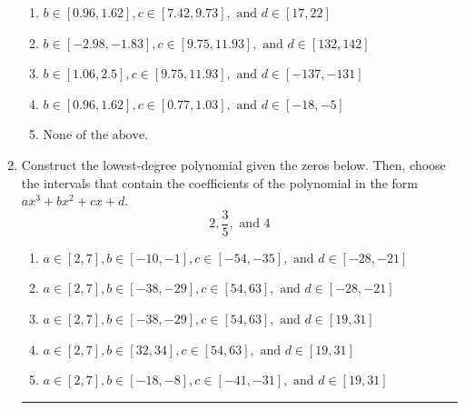 \documentclass[14pt]{extbook}
\newcommand{\litem}[1]{\item#1\hspace*{-1cm}\rule{\textwidth}{0.4pt}}
\begin{document}
\begin{enumerate}
{\begin{enumerate}[label=\Alph*.]
\item \( b \in [0.96, 1.62], c \in [7.42, 9.73], \text{ and } d \in [17, 22] \)
\item \( b \in [-2.98, -1.83], c \in [9.75, 11.93], \text{ and } d \in [132, 142] \)
\item \( b \in [1.06, 2.5], c \in [9.75, 11.93], \text{ and } d \in [-137, -131] \)
\item \( b \in [0.96, 1.62], c \in [0.77, 1.03], \text{ and } d \in [-18, -5] \)
\item \( \text{None of the above.} \)

\end{enumerate} }
\litem{
Construct the lowest-degree polynomial given the zeros below. Then, choose the intervals that contain the coefficients of the polynomial in the form $ax^3+bx^2+cx+d$.\[ 2, \frac{3}{5}, \text{ and } 4 \]\begin{enumerate}[label=\Alph*.]
\item \( a \in [2, 7], b \in [-10, -1], c \in [-54, -35], \text{ and } d \in [-28, -21] \)
\item \( a \in [2, 7], b \in [-38, -29], c \in [54, 63], \text{ and } d \in [-28, -21] \)
\item \( a \in [2, 7], b \in [-38, -29], c \in [54, 63], \text{ and } d \in [19, 31] \)
\item \( a \in [2, 7], b \in [32, 34], c \in [54, 63], \text{ and } d \in [19, 31] \)
\item \( a \in [2, 7], b \in [-18, -8], c \in [-41, -31], \text{ and } d \in [19, 31] \)


\end{enumerate}}
\end{enumerate}
\end{document}
